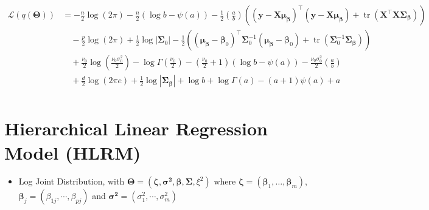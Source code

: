 \begin{appendix}
\begin{itemize}
\begin{equation}
\begin{split}
\mathcal{L}(q(\bm{\Theta})) 
&=-\frac{n}{2}\log(2\pi) - \frac{n}{2}\left(\log b -\psi(a)\right)
- \frac{1}{2}\left(\frac{a}{b}\right)\left((\bm{y} - \bm{X}  \bm\mu_{\bm{\beta}})^{\top}
(\bm{y} - \bm{X} \bm\mu_{\bm{\beta}}) + \operatorname{tr}\left(\bm{X}^{\top}\bm{X}\bm{\Sigma}_{\bm{\beta}}\right)\right)\\
&\quad - \frac{p}{2}\log(2\pi) + \frac{1}{2}\log|\bm\Sigma_{0}|
- \frac{1}{2}
\left((\bm\mu_{\bm\beta}-\bm\beta_{0})^{\top}
\bm\Sigma_{0}^{-1}(\bm\mu_{\bm\beta}-\bm\beta_{0})+\operatorname{tr}(\bm\Sigma_0^{-1}\bm\Sigma_{\bm{\beta}})\right)\\
&\quad + \frac{\nu_{0}}{2}\log \left(\frac{\nu_0\sigma_{0}^2}{2}\right) - \log\Gamma\left(\frac{\nu_{0}}{2}\right)
- \left(\frac{\nu_{0}}{2}+1\right)\left(\log b -\psi(a)\right)
- \frac{\nu_0\sigma_{0}^2}{2}\left(\frac{a}{b}\right)\\
&\quad+\frac{d}{2}\log(2\pi e)+\frac{1}{2}\log|\bm{\Sigma}_{\bm{\beta}}|+\log b+\log\Gamma(a)-(a+1)\psi(a)+a\\
\end{split}
\end{equation}

\end{itemize}

\newpage

\section{Hierarchical Linear Regression Model (HLRM)}

\begin{itemize}

\item Log Joint Distribution, with $\bm{\Theta}=(\bm{\zeta},\bm{\sigma^2},\bm{\beta},\bm{\Sigma},\xi^2)$ where $\bm{\zeta}=(\bm{\beta}_1, \ldots, \bm{\beta}_m)$,    $\bm{\beta}_j=(\beta_{1j},\cdots,\beta_{pj})$ and $\bm{\sigma^2}=(\sigma_1^2,\cdots,\sigma_m^2)$


\end{itemize}
\end{appendix}
